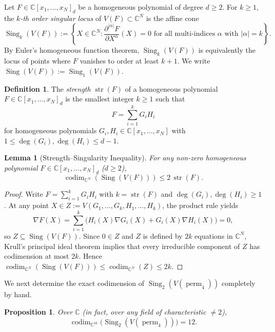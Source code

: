 \documentclass[11pt,a4paper]{article}
\newtheorem{lemma}[theorem]{Lemma}
\newtheorem{proposition}[theorem]{Proposition}
\theoremstyle{definition}
\newtheorem{definition}[theorem]{Definition}
\DeclareMathOperator{\perm}{perm}
\DeclareMathOperator{\codim}{codim}
\DeclareMathOperator{\Sing}{Sing}
\DeclareMathOperator{\str}{str}
\begin{document}
Let $F \in \mathbb{C}[x_1,\dots,x_N]_d$ be a homogeneous polynomial of degree $d \ge 2$.
For $k \ge 1$, the \emph{$k$-th order singular locus} of $V(F) \subset \mathbb{C}^N$ is the affine cone
\[
  \Sing_k(V(F)) := \left\{ X \in \mathbb{C}^N : \frac{\partial^{|\alpha|} F}{\partial X^\alpha}(X) = 0 \text{ for all multi-indices } \alpha \text{ with } |\alpha| = k \right\}.
\]
By Euler's homogeneous function theorem, $\Sing_k(V(F))$ is equivalently the locus of points where $F$ vanishes to order at least $k+1$. We write $\Sing(V(F)) := \Sing_1(V(F))$.

\begin{definition}
The \emph{strength} $\str(F)$ of a homogeneous polynomial $F \in \mathbb{C}[x_1,\dots,x_N]_d$ is the smallest integer $k \ge 1$ such that
\[
  F = \sum_{i=1}^k G_i H_i
\]
for homogeneous polynomials $G_i, H_i \in \mathbb{C}[x_1,\dots,x_N]$ with $1 \le \deg(G_i), \deg(H_i) \le d - 1$.
\end{definition}

\begin{lemma}[Strength--Singularity Inequality]\label{lem:strength}
For any non-zero homogeneous polynomial $F \in \mathbb{C}[x_1,\dots,x_N]_d$ ($d \ge 2$),
\[
  \codim_{\mathbb{C}^N}(\Sing(V(F))) \le 2\,\str(F).
\]
\end{lemma}

\begin{proof}
Write $F = \sum_{i=1}^k G_i H_i$ with $k = \str(F)$ and $\deg(G_i), \deg(H_i) \ge 1$. At any point $X \in Z := V(G_1,\dots,G_k, H_1,\dots,H_k)$, the product rule yields
\[
  \nabla F(X) = \sum_{i=1}^k \big(H_i(X)\nabla G_i(X) + G_i(X)\nabla H_i(X)\big) = 0,
\]
so $Z \subseteq \Sing(V(F))$. Since $0 \in Z$ and $Z$ is defined by $2k$ equations in $\mathbb{C}^N$, Krull's principal ideal theorem implies that every irreducible component of $Z$ has codimension at most $2k$. Hence $\codim_{\mathbb{C}^N}(\Sing(V(F))) \le \codim_{\mathbb{C}^N}(Z) \le 2k$.
\end{proof}

We next determine the exact codimension of $\Sing_2(V(\perm_4))$ completely by hand.

\begin{proposition}\label{prop:sing2}
Over $\mathbb{C}$ (in fact, over any field of characteristic $\neq 2$),
\[
  \codim_{\mathbb{C}^{16}}\big(\Sing_2(V(\perm_4))\big) = 12.
\]
\end{proposition}
\end{document}
